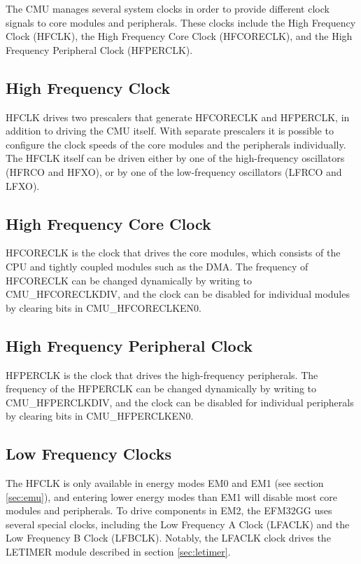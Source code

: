 The CMU manages several system clocks in order to provide different clock signals to core modules and peripherals. These clocks include the High Frequency Clock (HFCLK), the High Frequency Core Clock (HFCORECLK), and the High Frequency Peripheral Clock (HFPERCLK).\cite{efm32gg-rm}

\subsection{High Frequency Clock}
HFCLK drives two prescalers that generate HFCORECLK and HFPERCLK, in addition to driving the CMU itself. With separate prescalers it is possible to configure the clock speeds of the core modules and the peripherals individually. The HFCLK itself can be driven either by one of the high-frequency oscillators (HFRCO and HFXO), or by one of the low-frequency oscillators (LFRCO and LFXO). 

\subsection{High Frequency Core Clock}
HFCORECLK is the clock that drives the core modules, which consists of the CPU and tightly coupled modules such as the DMA. The frequency of HFCORECLK can be changed dynamically by writing to CMU\_HFCORECLKDIV, and the clock can be disabled for individual modules by clearing bits in CMU\_HFCORECLKEN0. 

\subsection{High Frequency Peripheral Clock}
HFPERCLK is the clock that drives the high-frequency peripherals. The frequency of the HFPERCLK can be changed dynamically by writing to CMU\_HFPERCLKDIV, and the clock can be disabled for individual peripherals by clearing bits in CMU\_HFPERCLKEN0. 

\subsection{Low Frequency Clocks}
The HFCLK is only available in energy modes EM0 and EM1 (see section \ref{sec:emu}), and entering lower energy modes than EM1 will disable most core modules and peripherals. To drive components in EM2, the EFM32GG uses several special clocks, including the Low Frequency A Clock (LFACLK) and the Low Frequency B Clock (LFBCLK). Notably, the LFACLK clock drives the LETIMER module described in section \ref{sec:letimer}.

